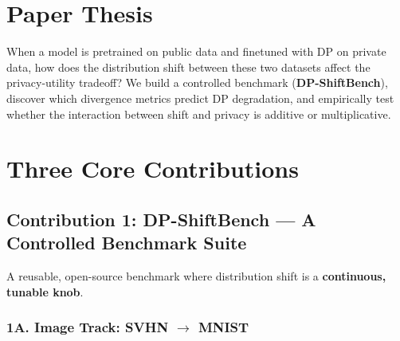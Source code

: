 \documentclass[11pt,a4paper]{article}
\begin{document}
\section{Paper Thesis}

\begin{thesisbox}
When a model is pretrained on public data and finetuned with DP on private data, how does the distribution shift between these two datasets affect the privacy-utility tradeoff? We build a controlled benchmark (\textbf{DP-ShiftBench}), discover which divergence metrics predict DP degradation, and empirically test whether the interaction between shift and privacy is additive or multiplicative.
\end{thesisbox}

\section{Three Core Contributions}

\subsection{Contribution 1: DP-ShiftBench --- A Controlled Benchmark Suite}

A reusable, open-source benchmark where distribution shift is a \textbf{continuous, tunable knob}.

\subsubsection{1A. Image Track: SVHN $\rightarrow$ MNIST}
\end{document}
